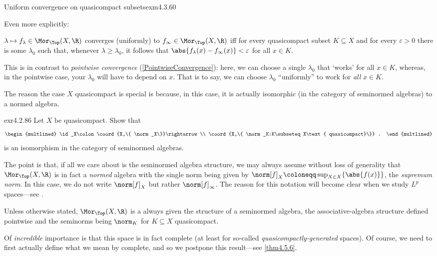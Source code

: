 \begin{exm}{Uniform convergence on quasicompact subsets}{exm4.3.60}
\begin{displayquote}
\end{displayquote}
Even more explicitly:
\begin{displayquote}
$\lambda \mapsto f_{\lambda}\in \Mor _{\Top}(X,\R )$ converges (uniformly) to $f_{\infty}\in \Mor _{\Top}(X,\R )$ iff for every quasicompact subset $K\subseteq X$ and for every $\varepsilon >0$ there is some $\lambda _0$ such that, whenever $\lambda \geq \lambda _0$, it follows that $\abs{f_{\lambda}(x)-f_{\infty}(x)}<\varepsilon$ for all $x\in K$.
\end{displayquote}
This is in contrast to \emph{pointwise convergence} (\cref{PointwiseConvergence}):  here, we can choose a single $\lambda _0$ that `works' for all $x\in K$, whereas, in the pointwise case, your $\lambda _0$ will have to depend on $x$.  That is to say, we can choose $\lambda _0$ ``uniformly'' to work for \emph{all} $x\in K$.

The reason the case $X$ quasicompact is special is because, in this case, it is actually isomorphic (in the category of seminormed algebras) to a normed algebra.
\begin{exr}[breakable=false]{}{exr4.2.86}
Let $X$ be quasicompact.  Show that
\begin{equation}
\begin{multlined}
\id _X\colon \coord{X,\{ \norm _X\}}\rightarrow \\ \coord{X,\{ \norm _K:K\subseteq X\text{ quasicompact}\}} .
\end{multlined}
\end{equation}
is an isomorphism in the category of seminormed algebras.
\begin{rmk}
The point is that, if all we care about is the seminormed algebra structure, we may always assume without loss of generality that $\Mor _{\Top}(X,\R )$ is in fact a \emph{normed} algebra with the single norm being given by $\norm[f]_X\coloneqq \sup _{X\in X}\{ \abs{f(x)}\}$, the \emph{supremum norm}.  In this case, we do not write $\norm[f]_X$ but rather $\norm[f]_\infty$\index[notation]{$\norm[f]_\infty$}.  The reason for this notation will become clear when we study $L^p$ spaces---see .
\end{rmk}
\end{exr}
\begin{displayquote}
Unless otherwise stated, $\Mor _{\Top}(X,\R )$ is a always given the structure of a seminormed algebra, the associative-algebra structure defined pointwise and the seminorms being $\norm _K$ for $K\subseteq X$ quasicompact.
\end{displayquote}

Of \emph{incredible} importance is that this space is in fact complete (at least for so-called \emph{quasicompactly-generated} spaces).  Of course, we need to first actually define what we mean by complete, and so we postpone this result---see \cref{thm4.5.6}.
\end{exm}
